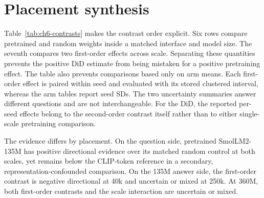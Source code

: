 \section{Placement synthesis}
\label{sec:ch6-placement}
Table~\ref{tab:ch6-contrasts} makes the contrast order explicit. Six rows
compare pretrained and random weights inside a matched interface and model
size. The seventh compares two first-order effects across scale. Separating
these quantities prevents the positive DiD estimate from being mistaken for a
positive pretraining effect. The table also prevents comparisons based only on
arm means. Each first-order effect is paired within seed and evaluated with its
stored clustered interval, whereas the arm tables report seed SDs. The two
uncertainty summaries answer different questions and are not interchangeable.
For the DiD, the reported per-seed effects belong to the second-order contrast
itself rather than to either single-scale pretraining comparison.

\begin{table}[p]
\centering
\caption[Pretraining contrasts and scale interaction.]{Canonical development contrasts with image-clustered intervals and governed outcomes. First-order effects are pretrained minus the architecture-matched random control at the corresponding size; positive favours pretraining. The 360M difference in differences is a second-order interaction across scales. Selection is matched within each first-order row; cross-family synthesis is a juxtaposition. Zero-containing intervals are classified as uncertain or mixed evidence.}
\label{tab:ch6-contrasts}
\begingroup\scriptsize\setlength{\tabcolsep}{0.45pt}
\makeatletter
\let\chSixArrayParboxRestore\@arrayparboxrestore
\def\@arrayparboxrestore{\chSixArrayParboxRestore\raggedright\let\\\tabularnewline}
\makeatother
\renewenvironment{longtable}[1]{\begin{tabular}{|p{0.12\textwidth}|p{0.085\textwidth}|p{0.07\textwidth}|p{0.06\textwidth}|p{0.10\textwidth}|p{0.07\textwidth}|p{0.115\textwidth}|p{0.15\textwidth}|p{0.13\textwidth}|}}{\end{tabular}}
\let\endhead\relax\renewcommand{\_}{\textunderscore\allowbreak}

\endgroup
\end{table}

The evidence differs by placement. On the question side, pretrained
SmolLM2-135M has positive directional evidence over its matched random control
at both scales, yet remains below the CLIP-token reference in a secondary,
representation-confounded comparison. On the 135M answer side, the first-order
contrast is negative directional at 40k and uncertain or mixed at 250k. At
360M, both first-order contrasts and the scale interaction are uncertain or
mixed.

